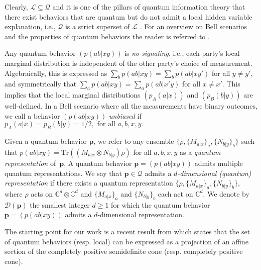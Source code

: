 \documentclass{siamart}
\begin{document}
{{Clearly, {${\mathcal{L}}\subseteq {\mathcal{Q}}$} and it  is one of the pillars of
quantum information theory that there exist behaviors  that are
quantum but do not admit a local hidden variable  explanation, i.e.,
$ {\mathcal{Q}}$ is a strict superset of ${\mathcal{L}}$ \cite{B64,B66}. For an  overview on Bell
scenarios and the   properties of   quantum behaviors  the
 reader is referred to \cite{Brunner14}.

Any  quantum behavior ${(p(ab|xy))}$ is {\em no-signaling}, i.e., each
party's  local marginal distribution is independent of the other
party's choice of measurement. Algebraically, this is expressed {as}
$\sum_bp(ab|xy)= \sum_bp(ab|xy')$ for all $ y\ne y'$, and
symmetrically that $\sum_ap(ab|xy)= \sum_ap(ab|x'y)$ for all $x\ne
x'$. This implies that the local marginal distributions $(p_A(a|x))$
and $(p_B(b|y))$ are well-defined. In {a} Bell scenario where all the measurements
 have binary outcomes, we call a behavior ${(p(ab|xy))}$ {\em
unbiased} if
$p_A(a|x)=p_B(b|y)=1/2, \text{ for all } a,b,x,y. $

Given a quantum behavior ${\mathbf{p}}$, we refer to any ensemble $\{\rho,\{
M_{a|x}\}_a, \{ N_{b|y}\}_b\}$ such that $p(ab|xy) = {\mathrm{Tr}}\left((M_{a|x}
\otimes N_{b|y} )\rho\right)$ for all $a,b,x,y$ as a {\em quantum
representation} of~${\mathbf{p}}$. A quantum behavior
${\mathbf{p}}={(p(ab|xy))}$ admits multiple quantum representations.  We say that
${\mathbf{p}}\in {\mathcal{Q}}$ admits a \emph{$d$-dimensional (quantum)
representation} if there exists a quantum representation $\{\rho,\{
M_{a|x}\}_a, \{ N_{b|y}\}_b\}$, where $\rho$ acts on ${\mathbb{C}}^d\otimes
{\mathbb{C}}^d$ {and $\{ M_{a|x}\}_a$ and $\{ N_{b|y}\}_b$ each act on} ${\mathbb{C}}^d$.
We denote  by $\mathcal{D}({\mathbf{p}})$ the smallest integer $d\ge 1$ for which the quantum behavior ${\mathbf{p}}={(p(ab|xy))}$ admits a $d$-dimensional representation.

The starting point for our work  is a recent result from  \cite{SV} which states {that}  the set of quantum behaviors (resp. local)  can be expressed as a projection of an affine section of the completely positive semidefinite cone (resp. completely positive cone).

}}
\end{document}
